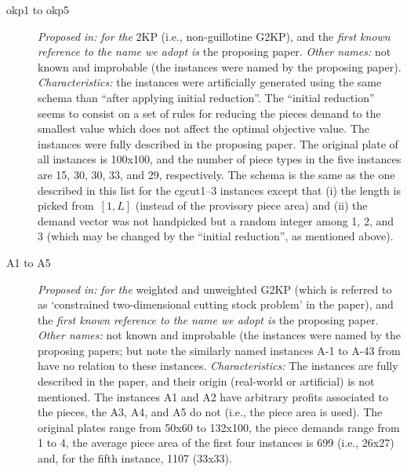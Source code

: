 \documentclass[ppgc,tese,english,formais,babel]{iiufrgs}
\begin{document}
\begin{description}
\item [okp1 to okp5] \emph{Proposed in:} \citet{fekete:1997} \emph{for the} 2KP (i.e., non-guillotine G2KP), and the \emph{first known reference to the name we adopt is} the proposing paper. \emph{Other names:} not known and improbable (the instances were named by the proposing paper). \emph{Characteristics: } the instances were artificially generated using the same schema than \citet{beasley:1985:nonguillotine} ``after applying initial reduction''. The ``initial reduction'' seems to consist on a set of rules for reducing the pieces demand to the smallest value which does not affect the optimal objective value. The instances were fully described in the proposing paper. The original plate of all instances is 100x100, and the number of piece types in the five instances are 15, 30, 30, 33, and 29, respectively. The schema is the same as the one described in this list for the cgcut1--3 instances except that (i) the length is picked from~\([1, L]\) (instead of the provisory piece area) and (ii) the demand vector was not handpicked but a random integer among 1, 2, and 3 (which may be changed by the ``initial reduction'', as mentioned above).
\item [A1 to A5] \emph{Proposed in:} \citet{hifi:1997} \emph{for the} weighted and unweighted G2KP (which is referred to as `constrained two-dimensional cutting stock problem' in the paper), and the \emph{first known reference to the name we adopt is} the proposing paper. \emph{Other names:} not known and improbable (the instances were named by the proposing papers; but note the similarly named instances A-1 to A-43 from \citet{macedo:2010} have no relation to these instances. \emph{Characteristics: } The instances are fully described in the paper, and their origin (real-world or artificial) is not mentioned. The instances A1 and A2 have arbitrary profits associated to the pieces, the A3, A4, and A5 do not (i.e., the piece area is used). The original plates range from 50x60 to 132x100, the piece demands range from 1 to 4, the average piece area of the first four instances is 699 (i.e., 26x27) and, for the fifth instance, 1107 (33x33).

\end{description}
\end{document}
